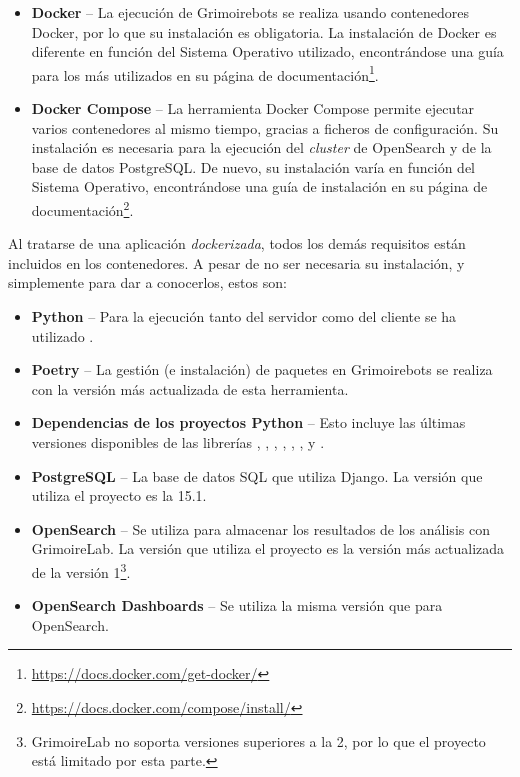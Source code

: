 \begin{itemize}
    \item \textbf{Docker} -- La ejecución de Grimoirebots se realiza usando contenedores Docker, por lo que su instalación es obligatoria. La instalación de Docker es diferente en función del Sistema Operativo utilizado, encontrándose una guía para los más utilizados en su página de documentación\footnote{\url{https://docs.docker.com/get-docker/}}.
    \item \textbf{Docker Compose} -- La herramienta Docker Compose permite ejecutar varios contenedores al mismo tiempo, gracias a ficheros de configuración. Su instalación es necesaria para la ejecución del \emph{cluster} de OpenSearch y de la base de datos PostgreSQL. De nuevo, su instalación varía en función del Sistema Operativo, encontrándose una guía de instalación en su página de documentación\footnote{\url{https://docs.docker.com/compose/install/}}.
\end{itemize}

Al tratarse de una aplicación \emph{dockerizada}, todos los demás requisitos están incluidos en los contenedores. A pesar de no ser necesaria su instalación, y simplemente para dar a conocerlos, estos son:

\begin{itemize}
    \item \textbf{Python} -- Para la ejecución tanto del servidor como del cliente se ha utilizado .
    \item \textbf{Poetry} -- La gestión (e instalación) de paquetes en Grimoirebots se realiza con la versión más actualizada de esta herramienta.
    \item \textbf{Dependencias de los proyectos Python} -- Esto incluye las últimas versiones disponibles de las librerías , , , , , ,  y .
    \item \textbf{PostgreSQL} -- La base de datos SQL que utiliza Django. La versión que utiliza el proyecto es la 15.1.
    \item \textbf{OpenSearch} -- Se utiliza para almacenar los resultados de los análisis con GrimoireLab. La versión que utiliza el proyecto es la versión más actualizada de la versión 1\footnote{GrimoireLab no soporta versiones superiores a la 2, por lo que el proyecto está limitado por esta parte.}.
    \item \textbf{OpenSearch Dashboards} -- Se utiliza la misma versión que para OpenSearch.
\end{itemize}


